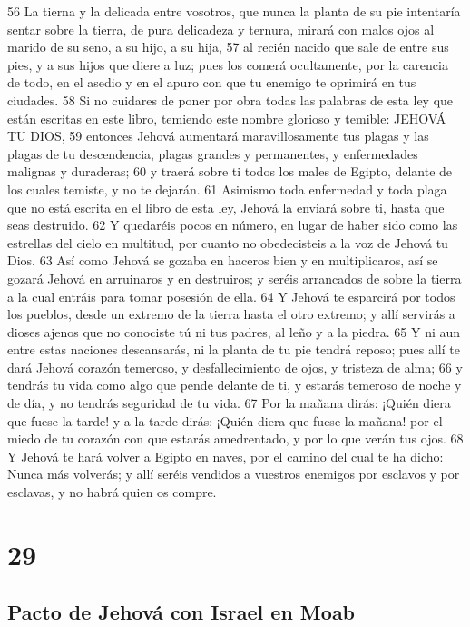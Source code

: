 56 La tierna y la delicada entre vosotros, que nunca la planta de su pie intentaría sentar sobre la tierra, de pura delicadeza y ternura, mirará con malos ojos al marido de su seno, a su hijo, a su hija,
57 al recién nacido que sale de entre sus pies, y a sus hijos que diere a luz; pues los comerá ocultamente, por la carencia de todo, en el asedio y en el apuro con que tu enemigo te oprimirá en tus ciudades.
58 Si no cuidares de poner por obra todas las palabras de esta ley que están escritas en este libro, temiendo este nombre glorioso y temible: JEHOVÁ TU DIOS,
59 entonces Jehová aumentará maravillosamente tus plagas y las plagas de tu descendencia, plagas grandes y permanentes, y enfermedades malignas y duraderas;
60 y traerá sobre ti todos los males de Egipto, delante de los cuales temiste, y no te dejarán.
61 Asimismo toda enfermedad y toda plaga que no está escrita en el libro de esta ley, Jehová la enviará sobre ti, hasta que seas destruido.
62 Y quedaréis pocos en número, en lugar de haber sido como las estrellas del cielo en multitud, por cuanto no obedecisteis a la voz de Jehová tu Dios.
63 Así como Jehová se gozaba en haceros bien y en multiplicaros, así se gozará Jehová en arruinaros y en destruiros; y seréis arrancados de sobre la tierra a la cual entráis para tomar posesión de ella.
64 Y Jehová te esparcirá por todos los pueblos, desde un extremo de la tierra hasta el otro extremo; y allí servirás a dioses ajenos que no conociste tú ni tus padres, al leño y a la piedra.
65 Y ni aun entre estas naciones descansarás, ni la planta de tu pie tendrá reposo; pues allí te dará Jehová corazón temeroso, y desfallecimiento de ojos, y tristeza de alma;
66 y tendrás tu vida como algo que pende delante de ti, y estarás temeroso de noche y de día, y no tendrás seguridad de tu vida.
67 Por la mañana dirás: ¡Quién diera que fuese la tarde! y a la tarde dirás: ¡Quién diera que fuese la mañana! por el miedo de tu corazón con que estarás amedrentado, y por lo que verán tus ojos.
68 Y Jehová te hará volver a Egipto en naves, por el camino del cual te ha dicho: Nunca más volverás; y allí seréis vendidos a vuestros enemigos por esclavos y por esclavas, y no habrá quien os compre.

\chapter{29}


\section{Pacto de Jehová con Israel en Moab}


